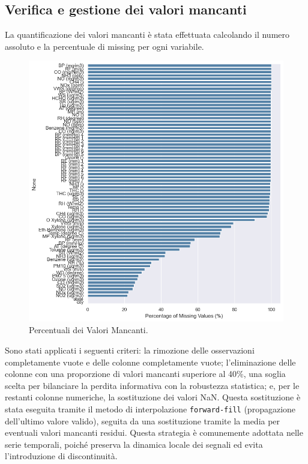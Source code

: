 \documentclass[a4paper,12pt]{report}
\begin{document}
	\subsection{Verifica e gestione dei valori mancanti}
	La quantificazione dei valori mancanti è stata effettuata calcolando il numero assoluto e la percentuale di missing per ogni variabile.
	
	\begin{figure}[H]
		\centering
		\includegraphics[width=1.0\textwidth]{img/miss_value_pm.png}
		\caption{Percentuali dei Valori Mancanti.}
	\end{figure}
	
	Sono stati applicati i seguenti criteri: la rimozione delle osservazioni completamente vuote e delle colonne completamente vuote; l'eliminazione delle colonne con una proporzione di valori mancanti superiore al 40\%, una soglia scelta per bilanciare la perdita informativa con la robustezza statistica; e, per le restanti colonne numeriche, la sostituzione dei valori NaN. Questa sostituzione è stata eseguita tramite il metodo di interpolazione \texttt{forward-fill} (propagazione dell'ultimo valore valido), seguita da una sostituzione tramite la media per eventuali valori mancanti residui. Questa strategia è comunemente adottata nelle serie temporali, poiché preserva la dinamica locale dei segnali ed evita l'introduzione di discontinuità.
	
\end{document}
